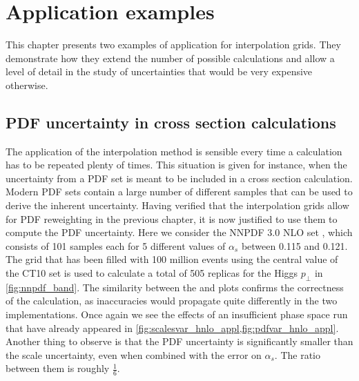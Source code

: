 
\chapter{Application examples}
\label{ch:examples}
This chapter presents two examples of application for interpolation grids.
They demonstrate how they extend the number of possible calculations and allow a level of detail in the study of uncertainties that would be very expensive otherwise.
%
\section{PDF uncertainty in cross section calculations}
The application of the interpolation method is sensible every time a calculation has to be repeated plenty of times.
This situation is given for instance, when the uncertainty from a PDF set is meant to be included in a cross section calculation.
Modern PDF sets contain a large number of different samples that can be used to derive the inherent uncertainty.
Having verified that the interpolation grids allow for PDF reweighting in the previous chapter, it is now justified to use them to compute the PDF uncertainty.
Here we consider the NNPDF 3.0 NLO set \cite{nnpdf30}, which consists of \num{101} samples each for \num{5} different values of $\alpha_s$ between \num{0.115} and \num{0.121}.
The grid that has been filled with 100 million events using the central value of the CT10 set is used to calculate a total of 505 replicas for the Higgs $p_\perp$ in \cref{fig:nnpdf_band}.
The similarity between the \appl{} and \fnlo{} plots confirms the correctness of the calculation, as inaccuracies would propagate quite differently in the two implementations.
Once again we see the effects of an insufficient phase space run that have already appeared in \cref{fig:scalesvar_hnlo_appl,fig:pdfvar_hnlo_appl}.
Another thing to observe is that the PDF uncertainty is significantly smaller than the scale uncertainty, even when combined with the error on $\alpha_s$.
The ratio between them is roughly $\frac{1}{6}$.
%
